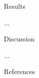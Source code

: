 \documentclass[10pt]{beamer}
\begin{document}
\begin{frame}{Results}

...

\end{frame}

\begin{frame}{Discussion}

...

\end{frame}

\begin{frame}[allowframebreaks]{References}
  \printbibliography
\end{frame}
\end{document}
